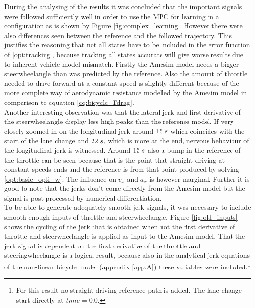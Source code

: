 During the analysing of the results it was concluded that the important signals were followed sufficiently well in order to use the MPC for learning in a configuration as is shown by Figure \ref{fig:complex_learning}. However there were also differences seen between the reference and the followed trajectory. This justifies the reasoning that not all states have to be included in the error function of \ref{opt:tracking}, because tracking all states accurate will give worse results due to inherent vehicle model mismatch. Firstly the Amesim model needs a bigger steerwheelangle than was predicted by the reference. Also the amount of throttle needed to drive forward at a constant speed is slightly different because of the more complete way of aerodynamic resistance modelled by the Amesim model in comparison to equation \ref{eq:bicycle_Fdrag}.\\
Another interesting observation was that the lateral jerk and first derivative of the steerwheelangle display less high peaks than the reference model. If very closely zoomed in on the longitudinal jerk around $15\hspace{1mm}s$ which coincides with the start of the lane change and $22\hspace{1mm}s$, which is more at the end, nervous behaviour of the longitudinal jerk is witnessed. Around $15\hspace{1mm}s$ also a bump in the reference of the throttle can be seen because that is the point that straight driving at constant speeds ends and the reference is from that point produced by solving \ref{opt:basic_opti_w}. The influence on $v_x$ and $a_x$ is however marginal. Further it is good to note that the jerks don't come directly from the Amesim model but the signal is post-processed by numerical differentiation. \\

To be able to generate adequately smooth jerk signals, it was necessary to include smooth enough inputs of throttle and steerwheelangle. Figure \ref{fig:old_inputs} shows the cycling of the jerk that is obtained when not the first derivative of throttle and steerwheelangle is applied as input to the Amesim model. That the jerk signal is dependent on the first derivative of the throttle and steeringwheelangle is a logical result, because also in the analytical jerk equations of the non-linear bicycle model (appendix \ref{app:A}) these variables were included.\footnote{For this result no straight driving reference path is added. The lane change start directly at $time = 0.0$.}

